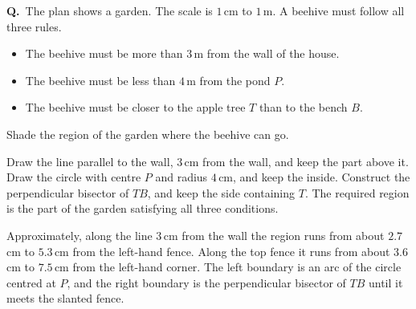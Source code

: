 \documentclass[12pt,a4paper]{article}
\newcounter{sol}
\newcommand{\s}{\refstepcounter{sol}\textbf{Q\thesol.}\ }
\newcommand{\place}[3]{\fill #1 circle (1.5pt); \node[inner sep=2pt,#2] at #1 {#3};}
\begin{document}
\s The plan shows a garden. The scale is \(1\)\,cm to \(1\)\,m. A beehive must follow all three rules.
\begin{itemize}
  \item The beehive must be more than \(3\)\,m from the wall of the house.
  \item The beehive must be less than \(4\)\,m from the pond \(P\).
  \item The beehive must be closer to the apple tree \(T\) than to the bench \(B\).
\end{itemize}
Shade the region of the garden where the beehive can go.

\begin{solbox}
Draw the line parallel to the wall, \(3\)\,cm from the wall, and keep the part above it. Draw the circle with centre \(P\) and radius \(4\)\,cm, and keep the inside. Construct the perpendicular bisector of \(TB\), and keep the side containing \(T\). The required region is the part of the garden satisfying all three conditions.

Approximately, along the line \(3\)\,cm from the wall the region runs from about \(2.7\)\,cm to \(5.3\)\,cm from the left-hand fence. Along the top fence it runs from about \(3.6\)\,cm to \(7.5\)\,cm from the left-hand corner. The left boundary is an arc of the circle centred at \(P\), and the right boundary is the perpendicular bisector of \(TB\) until it meets the slanted fence.
\end{solbox}

\begin{center}
\end{center}
\end{document}
